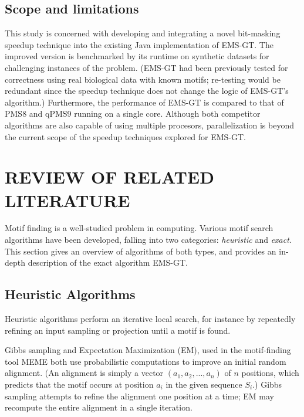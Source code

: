\documentclass[oneside,12pt]{DISCSthesis}
\begin{document}
	\section{Scope and limitations}
		This study is concerned with developing and integrating a novel bit-masking speedup technique into the existing Java implementation of EMS-GT. The improved version is benchmarked by its runtime on synthetic datasets for challenging instances of the problem. (EMS-GT had been previously tested for correctness using real biological data with known motifs; re-testing would be redundant since the speedup technique does not change the logic of EMS-GT's algorithm.)	
		Furthermore, the performance of EMS-GT is compared to that of PMS8 and qPMS9 running on a single core. Although both competitor algorithms are also capable of using multiple procesors, parallelization is beyond the current scope of the speedup techniques explored for EMS-GT.

\chapter{REVIEW OF RELATED LITERATURE}
	Motif finding is a well-studied problem in computing. Various motif search algorithms have been developed,
	falling into two categories: \emph{heuristic} and \emph{exact}. This section gives an overview of algorithms
	of both types, and provides an in-depth description of the exact algorithm EMS-GT.
	
	\section{Heuristic Algorithms}
		Heuristic algorithms perform an iterative local search, for instance by repeatedly refining an input sampling or projection until a motif is found.

		Gibbs sampling \cite{lawrence1993detecting} and Expectation Maximization (EM), used in the motif-finding tool MEME \cite{lawrence1990expectation,bailey1995unsupervised} both use probabilistic computations to improve an initial random alignment. (An alignment is simply a vector $(a_{1}, a_{2},...,a_{n})$ of $n$ positions, which predicts that the motif occurs at position $a_{i}$ in the given sequence $S_{i}$.) Gibbs sampling attempts to refine the alignment one position at a time; %
		EM may recompute the entire alignment in a single iteration. 
\end{document}
